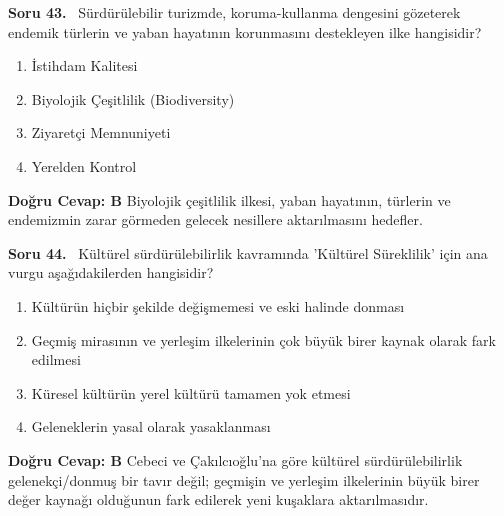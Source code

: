 \documentclass[11pt,a4paper,openany]{book}
\begin{document}
\needspace{5cm}
\vspace{8pt}
\noindent\textbf{\large\sffamily Soru 43.} \ Sürdürülebilir turizmde, koruma-kullanma dengesini gözeterek endemik türlerin ve yaban hayatının korunmasını destekleyen ilke hangisidir?
\begin{enumerate}[label=\Alph*), leftmargin=25pt, topsep=4pt, itemsep=2pt]
    \item İstihdam Kalitesi
    \item Biyolojik Çeşitlilik (Biodiversity)
    \item Ziyaretçi Memnuniyeti
    \item Yerelden Kontrol
\end{enumerate}
\vspace{4pt}
\begin{tcolorbox}[title=Cevap ve Açıklama, colback=gray!3!white, colframe=primarycolor!90!black, arc=2mm, fonttitle=\bfseries\sffamily, top=6pt, bottom=6pt]
    \textbf{Doğru Cevap: B}
    \vspace{2pt}
    Biyolojik çeşitlilik ilkesi, yaban hayatının, türlerin ve endemizmin zarar görmeden gelecek nesillere aktarılmasını hedefler.
\end{tcolorbox}
\vspace{10pt}

\needspace{5cm}
\vspace{8pt}
\noindent\textbf{\large\sffamily Soru 44.} \ Kültürel sürdürülebilirlik kavramında 'Kültürel Süreklilik' için ana vurgu aşağıdakilerden hangisidir?
\begin{enumerate}[label=\Alph*), leftmargin=25pt, topsep=4pt, itemsep=2pt]
    \item Kültürün hiçbir şekilde değişmemesi ve eski halinde donması
    \item Geçmiş mirasının ve yerleşim ilkelerinin çok büyük birer kaynak olarak fark edilmesi
    \item Küresel kültürün yerel kültürü tamamen yok etmesi
    \item Geleneklerin yasal olarak yasaklanması
\end{enumerate}
\vspace{4pt}
\begin{tcolorbox}[title=Cevap ve Açıklama, colback=gray!3!white, colframe=primarycolor!90!black, arc=2mm, fonttitle=\bfseries\sffamily, top=6pt, bottom=6pt]
    \textbf{Doğru Cevap: B}
    \vspace{2pt}
    Cebeci ve Çakılcıoğlu'na göre kültürel sürdürülebilirlik gelenekçi/donmuş bir tavır değil; geçmişin ve yerleşim ilkelerinin büyük birer değer kaynağı olduğunun fark edilerek yeni kuşaklara aktarılmasıdır.
\end{tcolorbox}
\vspace{10pt}
\end{document}
